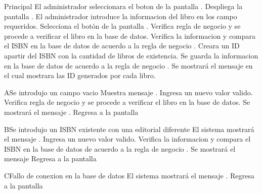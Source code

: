 \begin{UCtrayectoria}{Principal}
	\UCpaso[\UCactor] El administrador seleccionara el boton  de la pantalla .
	\UCpaso[\UCsist] Despliega la pantalla .
	\UCpaso[\UCactor] El administrador introduce la informacion del libro en los campo requeridos.
	\UCpaso[\UCactor] Selecciona el botón  de la pantalla .
	\UCpaso[\UCsist] Verifica regla de negocio  y se procede a verificar el libro en la base de datos.
	\UCpaso[\UCsist] Verifica la informacion y compara el ISBN en la base de datos de acuerdo a la regla de negocio  .
	\UCpaso[\UCsist] Creara un ID apartir del ISBN con la cantidad de libros de existencia.
	\UCpaso[\UCsist] Se guarda la informacion en la base de datos de acuerdo a la regla de negocio  .
	\UCpaso[\UCsist] Se mostrará el mensaje   en el cual mostrara las ID generados por cada libro.
\end{UCtrayectoria}
\begin{UCtrayectoriaA}{A}{Se introdujo un campo vacio}	
			\UCpaso[\UCsist] Muestra mensaje .
			\UCpaso[\UCactor] Ingresa un nuevo valor valido.
			\UCpaso[\UCsist] Verifica regla de negocio  y se procede a verificar el libro en la base de datos.
			\UCpaso[\UCsist] Se mostrará el mensaje .
			\UCpaso[\UCsist] Regresa a la pantalla 			
\end{UCtrayectoriaA}
\begin{UCtrayectoriaA}{B}{Se introdujo un ISBN existente con una editorial diferente}	
			\UCpaso[\UCsist] El sistema mostrará el mensaje .
			\UCpaso[\UCactor] Ingresa un nuevo valor valido.
			\UCpaso[\UCsist] Verifica la informacion y compara el ISBN en la base de datos de acuerdo a la regla de negocio  .
			\UCpaso[\UCsist] Se mostrará el mensaje 
			\UCpaso[\UCsist] Regresa a la pantalla 	
\end{UCtrayectoriaA}
\begin{UCtrayectoriaA}{C}{Fallo de conexion en la base de datos}
			\UCpaso[\UCsist] El sistema mostrará el mensaje .
			\UCpaso[\UCsist] Regresa a la pantalla 	
\end{UCtrayectoriaA}
